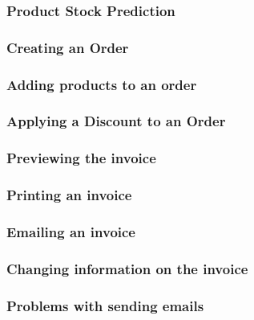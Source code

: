 \pagebreak
\subsubsection{Product Stock Prediction}
\label{fig:Product Stock Prediction}


\pagebreak
\subsubsection{Creating an Order}
\label{fig:Creating an Order}


\pagebreak
\subsubsection{Adding products to an order}
\label{fig:Adding products to an order}


\pagebreak
\subsubsection{Applying a Discount to an Order}
\label{fig:Applying a Discount to an Order}


\pagebreak
\subsubsection{Previewing the invoice}
\label{fig:Previewing the invoice}


\pagebreak
\subsubsection{Printing an invoice}
\label{fig:Printing an invoice}


\pagebreak
\subsubsection{Emailing an invoice}
\label{fig:Emailing an invoice}


\pagebreak
\subsubsection{Changing information on the invoice}
\label{fig:Changing information on the invoice}


\pagebreak
\subsubsection{Problems with sending emails}
\label{fig:Problems with sending emails}


